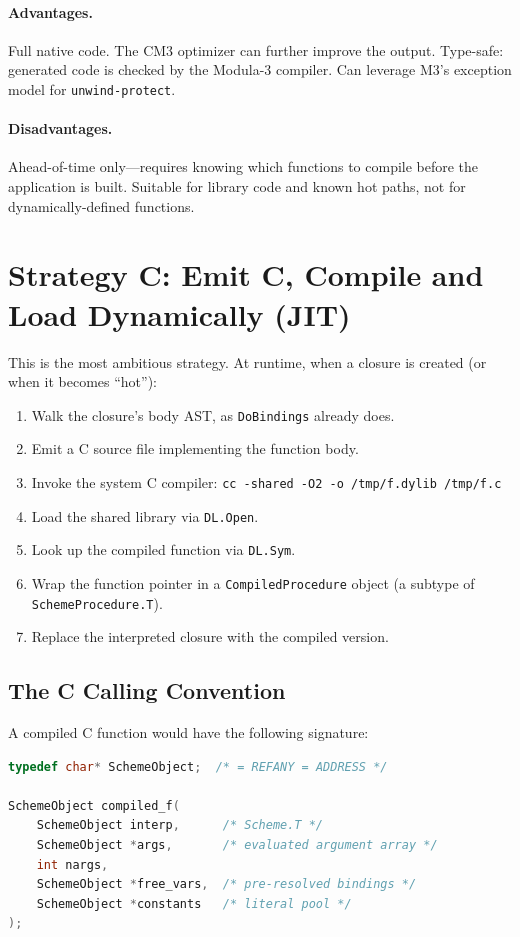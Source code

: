 \documentclass[12pt]{report}
\begin{document}
\paragraph{Advantages.}
Full native code.  The CM3 optimizer can further improve the output.
Type-safe: generated code is checked by the Modula-3 compiler.
Can leverage M3's exception model for \texttt{unwind-protect}.

\paragraph{Disadvantages.}
Ahead-of-time only---requires knowing which functions to compile
before the application is built.  Suitable for library code and
known hot paths, not for dynamically-defined functions.

\section{Strategy C: Emit C, Compile and Load Dynamically (JIT)}
\label{sec:stratC}

This is the most ambitious strategy.  At runtime, when a closure is
created (or when it becomes ``hot''):

\begin{enumerate}
\item Walk the closure's body AST, as \texttt{DoBindings} already does.
\item Emit a C source file implementing the function body.
\item Invoke the system C compiler: \texttt{cc -shared -O2 -o /tmp/f.dylib /tmp/f.c}
\item Load the shared library via \texttt{DL.Open}.
\item Look up the compiled function via \texttt{DL.Sym}.
\item Wrap the function pointer in a \texttt{CompiledProcedure}
  object (a subtype of \texttt{SchemeProcedure.T}).
\item Replace the interpreted closure with the compiled version.
\end{enumerate}

\subsection{The C Calling Convention}

A compiled C function would have the following signature:

\begin{lstlisting}[language=C]
typedef char* SchemeObject;  /* = REFANY = ADDRESS */

SchemeObject compiled_f(
    SchemeObject interp,      /* Scheme.T */
    SchemeObject *args,       /* evaluated argument array */
    int nargs,
    SchemeObject *free_vars,  /* pre-resolved bindings */
    SchemeObject *constants   /* literal pool */
);
\end{lstlisting}
\end{document}
